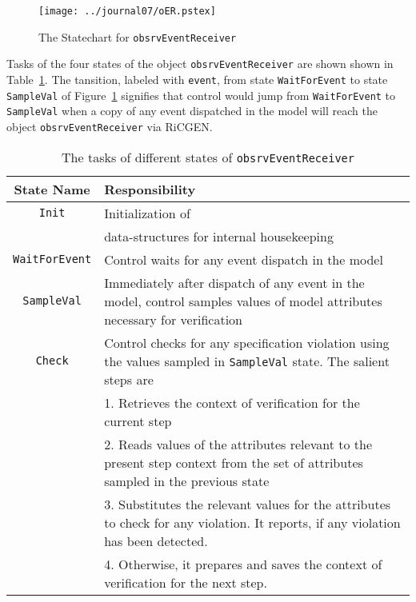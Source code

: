 \begin{figure}[htbp]
\begin{center}
\texttt{[image: ../journal07/oER.pstex]}
\end{center}
\caption{The Statechart for {\tt obsrvEventReceiver}} \label{fig8.5}
\end{figure}

\noindent
Tasks of the four states of the object {\tt obsrvEventReceiver} are shown 
shown in Table~\ref{tab:oER}. The tansition, labeled with {\tt event}, from 
state {\tt WaitForEvent} to state {\tt SampleVal} of Figure~\ref{fig8.5} 
signifies that control would jump from {\tt WaitForEvent} to {\tt SampleVal}
when a copy of any event dispatched in the model will reach the object 
{\tt obsrvEventReceiver} via RiCGEN. 

\begin{table}[!hbtp]
\caption{The tasks of different states of {\tt obsrvEventReceiver}}
\label{tab:oER}
\begin{center}

\begin{tabular}{|c|p{4.5in}|}
\hline
State Name & Responsibility \\
\hline \hline
{\tt Init} & Initialization of \\
	& data-structures for internal housekeeping\\
\hline
{\tt WaitForEvent} & Control waits for any event dispatch in the model\\
\hline
{\tt SampleVal} & Immediately after dispatch of any event in the model, control samples values of model attributes necessary for verification\\
\hline
{\tt Check} & Control checks for any specification violation using the values 
	sampled in {\tt SampleVal} state. The salient steps are\\
	& 1. Retrieves the context of verification for the current step\\
	& 2. Reads values of the attributes relevant to the present step context
		from the set of attributes sampled in the previous state\\
	& 3. Substitutes the relevant values for the attributes to check for 
		any violation. It reports, if any violation has been detected.\\
	& 4. Otherwise, it prepares and saves the context of verification for 
		the next step.\\
\hline
\end{tabular}
\end{center}
\end{table}

